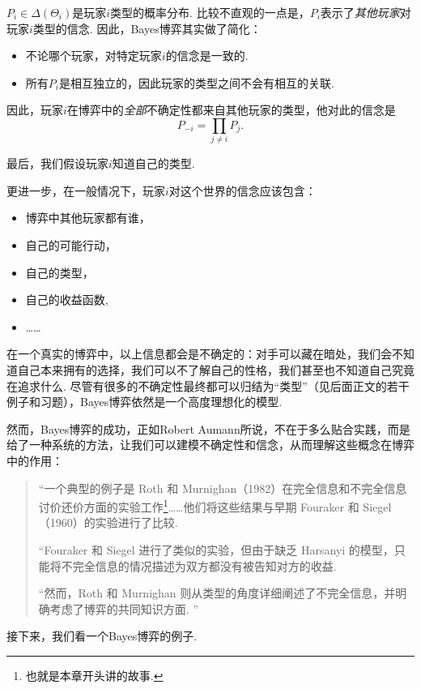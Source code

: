 $P_i\in\Delta(\Theta_i)$是玩家$i$类型的概率分布. 比较不直观的一点是，$P_i$表示了\emph{其他玩家}对玩家$i$类型的信念. 因此，Bayes博弈其实做了简化：
\begin{itemize}
    \item 不论哪个玩家，对特定玩家$i$的信念是一致的.
    \item 所有$P_i$是相互独立的，因此玩家的类型之间不会有相互的关联. 
\end{itemize}
因此，玩家$i$在博弈中的\emph{全部}不确定性都来自其他玩家的类型，他对此的信念是
\[P_{-i}=\prod_{j\neq i}P_j.\]

最后，我们假设玩家$i$知道自己的类型.

更进一步，在一般情况下，玩家$i$对这个世界的信念应该包含：
\begin{itemize}
    \item 博弈中其他玩家都有谁，
    \item 自己的可能行动，
    \item 自己的类型，
    \item 自己的收益函数,
    \item ……
\end{itemize}
在一个真实的博弈中，以上信息都会是不确定的：对手可以藏在暗处，我们会不知道自己本来拥有的选择，我们可以不了解自己的性格，我们甚至也不知道自己究竟在追求什么. 尽管有很多的不确定性最终都可以归结为“类型”（见后面正文的若干例子和习题），Bayes博弈依然是一个高度理想化的模型. 

然而，Bayes博弈的成功，正如Robert Aumann所说，不在于多么贴合实践，而是给了一种系统的方法，让我们可以建模不确定性和信念，从而理解这些概念在博弈中的作用：
\begin{quotation}
    “一个典型的例子是 Roth 和 Murnighan（1982）在完全信息和不完全信息讨价还价方面的实验工作\footnote{也就是本章开头讲的故事. }……他们将这些结果与早期 Fouraker 和 Siegel（1960）的实验进行了比较. 

    “Fouraker 和 Siegel 进行了类似的实验，但由于缺乏 Harsanyi 的模型，只能将不完全信息的情况描述为双方都没有被告知对方的收益. 
    
    “然而，Roth 和 Murnighan 则从类型的角度详细阐述了不完全信息，并明确考虑了博弈的共同知识方面. ”
\end{quotation}

接下来，我们看一个Bayes博弈的例子. 

